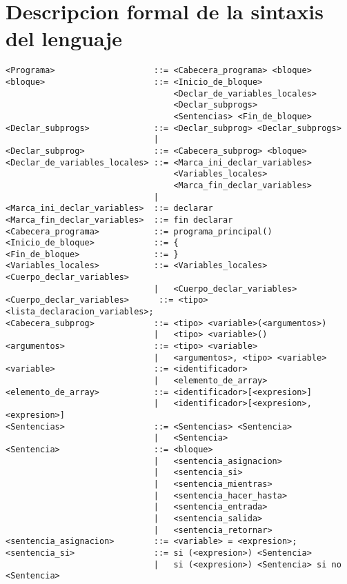 \section{Descripcion formal de la sintaxis del lenguaje}

\begin{lstlisting}[breaklines=true, basicstyle=\tiny]
<Programa>                    ::= <Cabecera_programa> <bloque>
<bloque>                      ::= <Inicio_de_bloque>
                                  <Declar_de_variables_locales>
                                  <Declar_subprogs>
                                  <Sentencias> <Fin_de_bloque>
<Declar_subprogs>             ::= <Declar_subprog> <Declar_subprogs>
                              |
<Declar_subprog>              ::= <Cabecera_subprog> <bloque>
<Declar_de_variables_locales> ::= <Marca_ini_declar_variables>
                                  <Variables_locales>
                                  <Marca_fin_declar_variables>
                              |
<Marca_ini_declar_variables>  ::= declarar
<Marca_fin_declar_variables>  ::= fin declarar
<Cabecera_programa>           ::= programa_principal()
<Inicio_de_bloque>            ::= {
<Fin_de_bloque>               ::= }
<Variables_locales>           ::= <Variables_locales> <Cuerpo_declar_variables>
                              |   <Cuerpo_declar_variables>
<Cuerpo_declar_variables>      ::= <tipo> <lista_declaracion_variables>;
<Cabecera_subprog>            ::= <tipo> <variable>(<argumentos>)
                              |   <tipo> <variable>()
<argumentos>                  ::= <tipo> <variable>
                              |   <argumentos>, <tipo> <variable>
<variable>                    ::= <identificador>
                              |   <elemento_de_array>
<elemento_de_array>           ::= <identificador>[<expresion>]
                              |   <identificador>[<expresion>, <expresion>]
<Sentencias>                  ::= <Sentencias> <Sentencia>
                              |   <Sentencia>
<Sentencia>                   ::= <bloque>
                              |   <sentencia_asignacion>
                              |   <sentencia_si>
                              |   <sentencia_mientras>
                              |   <sentencia_hacer_hasta>
                              |   <sentencia_entrada>
                              |   <sentencia_salida>
                              |   <sentencia_retornar>
<sentencia_asignacion>        ::= <variable> = <expresion>;
<sentencia_si>                ::= si (<expresion>) <Sentencia>
                              |   si (<expresion>) <Sentencia> si no <Sentencia>

\end{lstlisting}
